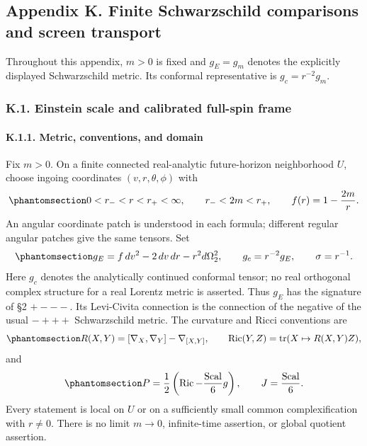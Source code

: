 \documentclass[
  english,
  11pt,
  reqno]{amsart}
\begin{document}
\clearpage
\protect{}\label{app:sh-schwarzschild}

\subsection{Appendix K. Finite Schwarzschild comparisons and screen
transport}\label{appendix-k.-finite-schwarzschild-comparisons-and-screen-transport}

Throughout this appendix, \(m>0\) is fixed and \(g_E=g_m\) denotes the
explicitly displayed Schwarzschild metric. Its conformal representative
is \(g_c=r^{-2}g_m\).

\protect{}\label{sec:sh-integrated-scale}

\subsubsection{K.1. Einstein scale and calibrated full-spin
frame}\label{k.1.-einstein-scale-and-calibrated-full-spin-frame}

\protect{}\label{sec:sh-scale-1}

\paragraph{K.1.1. Metric, conventions, and
domain}\label{k.1.1.-metric-conventions-and-domain}

Fix \(m>0\). On a finite connected real-analytic future-horizon
neighborhood \(U\), choose ingoing coordinates \((v,r,\theta,\phi)\)
with \begin{equation}\protect\phantomsection\label{eq:sh-scale-a1}{
0<r_-<r<r_+<\infty,\qquad r_-<2m<r_+,
\qquad f(r)=1-\frac{2m}{r}.
}\end{equation} An angular coordinate patch is understood in each
formula; different regular angular patches give the same tensors. Set
\begin{equation}\protect\phantomsection\label{eq:sh-scale-a2}{
g_E=f\,dv^2-2\,dv\,dr-r^2d\Omega_2^2,
\qquad g_c=r^{-2}g_E,
\qquad \sigma=r^{-1}.
}\end{equation} Here \(g_c\) denotes the analytically continued
conformal tensor; no real orthogonal complex structure for a real
Lorentz metric is asserted. Thus \(g_E\) has the signature of §2
\(+---\). Its Levi-Civita connection is the connection of the negative
of the usual \(-+++\) Schwarzschild metric. The curvature and Ricci
conventions are
\begin{equation}\protect\phantomsection\label{eq:sh-scale-a3}{
R(X,Y)=[\nabla_X,\nabla_Y]-\nabla_{[X,Y]},\qquad
\operatorname{Ric}(Y,Z)=\operatorname{tr}(X\mapsto R(X,Y)Z),
}\end{equation} and
\begin{equation}\protect\phantomsection\label{eq:sh-scale-a4}{
P=\frac12\left(\operatorname{Ric}-\frac{\operatorname{Scal}}6g\right),
\qquad J=\frac{\operatorname{Scal}}6.
}\end{equation} Every statement is local on \(U\) or on a sufficiently
small common complexification with \(r\ne0\). There is no limit
\(m\to0\), infinite-time assertion, or global quotient assertion.
\end{document}
